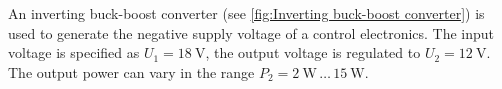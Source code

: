 

An inverting buck-boost converter (see \autoref{fig:Inverting buck-boost converter}) is used to generate the negative supply voltage of a control electronics. The input voltage is specified as $U_\mathrm{1}=\SI{18}{\volt}$, the output voltage is regulated to $U_\mathrm{2}=\SI{12}{\volt}$. The output power can vary in the range $P_\mathrm{2} = \SI{2}{\watt} \, \dots \, \SI{15}{\watt}$.




